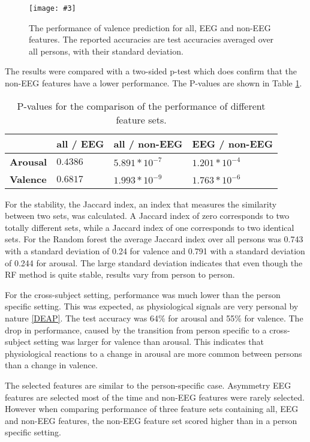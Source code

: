 \documentclass[11pt,journal,compsoc]{IEEEtran}
\newcommand{\npar}{\par \vspace{2.3ex plus 0.3ex minus 0.3ex}}
\newcommand{\mijnfiguur}[4][H]{            %
    \begin{figure}[#1]                      %
        \begin{center}                      %
            \texttt{[image: \#3]}        %
            \caption{#4\label{#3}}          %
        \end{center}
    \end{figure}
    }
\begin{document}
\mijnfiguur{width=.5\textwidth}{valencephyeegall}{The performance of valence prediction for all, EEG and non-EEG features. The reported accuracies are test accuracies averaged over all persons, with their standard deviation.}

The results were compared with a two-sided p-test which does confirm that the non-EEG features have a lower performance. The P-values are shown in Table \ref{pvals}.
\begin{table}[H]
\centering
\caption{P-values for the comparison of the performance of different feature sets.\label{pvals}}
\begin{tabular}{l|lll}
	    		 & \textbf{all / EEG} & \textbf{all / non-EEG} & \textbf{EEG / non-EEG} \\ \hline
\textbf{Arousal} & $0.4386$          & $5.891 * 10^{-7}$  & $1.201 * 10^{-4}$ \\
\textbf{Valence} & $0.6817$          & $1.993 * 10^{-9}$  & $1.763 * 10^{-6}$                 
\end{tabular}
\end{table}

For the stability, the Jaccard index, an index that measures the similarity between two sets, was calculated. A Jaccard index of zero corresponds to two totally different sets, while a Jaccard index of one corresponds to two identical sets. For the Random forest the average Jaccard index over all persons was 0.743 with a standard deviation of 0.24 for valence and 0.791 with a standard deviation of 0.244 for arousal. The large standard deviation indicates that even though the RF method is quite stable, results vary from person to person.

\npar

For the cross-subject setting, performance was much lower than the person specific setting. This was expected, as physiological signals are very personal by nature \ref{DEAP}. The test accuracy was 64\% for arousal and 55\% for valence. The drop in performance, caused by the transition from person specific to a cross-subject setting was larger for valence than arousal. This indicates that physiological reactions to a change in arousal are more common between persons than a change in valence. 

\npar

The selected features are similar to the person-specific case. Asymmetry EEG features are selected most of the time and non-EEG features were rarely selected. However when comparing performance of three feature sets containing all, EEG and non-EEG features, the non-EEG feature set scored higher than in a person specific setting.
\end{document}
